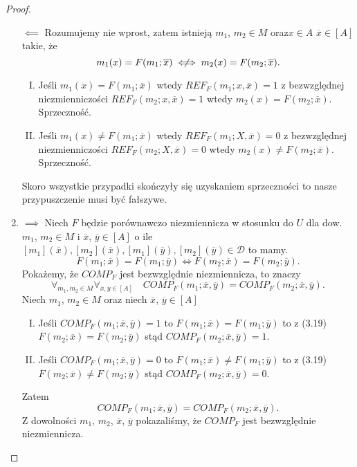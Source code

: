 \documentclass[12pt,a4paper]{report}
\newcommand{\domkniecie}[1]{\left\lbrack{#1}\right\rbrack}
\newcommand{\notiff}{%
  \mathrel{{\ooalign{\hidewidth$\not\phantom{"}$\hidewidth\cr$\iff$}}}}
\begin{document}
\begin{proof}
\begin{enumerate}
$\impliedby$
Rozumujemy nie wprost, zatem istnieją $m_1$, $m_2 \in M$ oraz$x\in A$ $\overline{x} \in \domkniecie{A}$ takie, że
$$
m_{1}(x)=F(m_{1};\overline{x}) \notiff m_{2}(x)=F(m_{2};\overline{x}).
$$
\begin{enumerate}[I.]
\item
Jeśli $m_1(x)=F(m_1;\overline{x})$ wtedy $REF_{F}(m_1;x,\overline{x})=1$ z bezwzględnej niezmienniczości $REF_{F}(m_2;x,\overline{x})=1$ wtedy $m_2(x)=F(m_2;\overline{x})$. Sprzeczność.
\item
Jeśli $m_1(x)\ne F(m_1;\overline{x})$ wtedy $REF_{F}(m_1;X,\overline{x})=0$ z bezwzględnej niezmienniczości $REF_{F}(m_2;X,\overline{x})=0$ wtedy $m_2(x)\ne F(m_2;\overline{x})$. Sprzeczność.
\end{enumerate}
Skoro wszystkie przypadki skończyły się uzyskaniem sprzeczności to nasze przypuszczenie musi być fałszywe.
\item 
$\implies$
Niech $F$ będzie porównawczo niezmiennicza w stosunku do $U$ 
dla dow. $m_1$, $m_2 \in M$ i $\overline{x}$, $\overline{y} \in \domkniecie{A}$ o ile $\domkniecie{m_1}(\overline{x}), \domkniecie{ m_2}(\overline{x}), \domkniecie{m_1}(\overline{y}), \domkniecie{m_2}(\overline{y}) \in \mathcal{D}$ to mamy.
\begin{equation}
F(m_{1};\overline{x})=F(m_{1};\overline{y}) \iff F(m_{2};\overline{x})=F(m_{2};\overline{y}).
\end{equation}
Pokażemy, że $COMP_{F}$ jest bezwzględnie niezmiennicza, to znaczy
\begin{equation}
\forall_{m_1, m_2 \in M} \forall_{\overline{x}, \overline{y}\in \domkniecie{A}} \quad COMP_{F}(m_1;\overline{x},\overline{y})=COMP_{F}(m_2;\overline{x},\overline{y}).
\end{equation}
 Niech $m_1$, $m_2 \in M$ oraz niech $\overline{x}$, $\overline{y} \in \domkniecie{A}$ 
\begin{enumerate}[I.]
\item
Jeśli $COMP_{F}(m_1;\overline{x},\overline{y})=1$ to $F(m_1;\overline{x})=F(m_1;\overline{y})$ to z (3.19) $F(m_2;\overline{x})=F(m_2;\overline{y})$ stąd $COMP_{F}(m_2;\overline{x},\overline{y})=1$.
\item
Jeśli $COMP_{F}(m_1;\overline{x},\overline{y})=0$ to $F(m_1;\overline{x})\ne F(m_1;\overline{y})$ to z (3.19) $F(m_2;\overline{x})\ne F(m_2;\overline{y})$ stąd $COMP_{F}(m_2;\overline{x},\overline{y})=0$.
\end{enumerate}
Zatem 
$$
COMP_{F}(m_1;\overline{x},\overline{y})=COMP_{F}(m_2;\overline{x},\overline{y}).
$$
Z dowolności $m_1$, $m_2$, $\overline{x}$, $\overline{y}$ pokazaliśmy, że $COMP_{F}$ jest bezwzględnie niezmiennicza.


\end{enumerate}
\end{proof}
\end{document}
